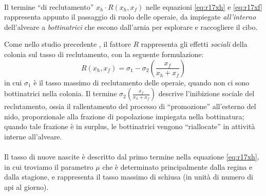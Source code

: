 
\paragraph{}
Il termine ``di reclutamento'' $x_h \cdot R(x_h, x_f)$ nelle equazioni \eqref{eq:r17xh} e \eqref{eq:r17xf} rappresenta appunto il passaggio di ruolo delle operaie, da impiegate \emph{all'interno} dell'alveare a \emph{bottinatrici} che escono dall'arnia per esplorare e raccogliere il cibo.

Come nello studio precedente \cite{khoury2011}, il fattore $R$ rappresenta gli effetti \emph{sociali}
della colonia sul tasso di reclutamento, con la seguente formulazione:
\begin{equation}
    \label{eq:reclutam}
    R(x_h, x_f) = \sigma_1 - \sigma_2 \left( \frac{x_f}{x_h + x_f} \right)
\end{equation}
in cui $\sigma_1$ è il tasso massimo di reclutamento delle operaie, quando non ci sono bottinatrici nella colonia.
Il termine $\sigma_2 \left( \frac{x_f}{x_h + x_f} \right)$ descrive l'inibizione sociale del reclutamento, ossia il rallentamento del processo di ``promozione'' all'esterno del nido, proporzionale alla frazione di popolazione impiegata nella bottinatura; quando tale frazione è in surplus, le bottinatrici vengono ``riallocate'' in attività interne all'alveare.

\paragraph{}
Il tasso di nuove nascite è descritto dal primo termine nella equazione \eqref{eq:r17xh}, in cui troviamo il parametro $\mu$ che è determinato principalmente dalla regina e dalla stagione, e rappresenta il tasso massimo di schiusa (in unità di numero di api al giorno).

